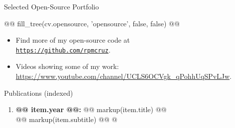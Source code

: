 \documentclass[11pt]{article}
\begin{document}
\bigskip
\centerline{\sc\large Selected Open-Source Portfolio}
\begin{multicols}{2}
\setlength{\columnseprule}{0.4pt}
@@ fill_tree(cv.opensource, 'opensource', false, false) @@
\begin{itemize}
\small
\renewcommand{\labelitemi}{$\blacktriangleright$}
\setlength{\itemindent}{-1.5em}
\itemsep0em 
\item Find more of my open-source code at\\\href{https://github.com/rpmcruz?tab=repositories}{\tt https://github.com/rpmcruz}.
\item Videos showing some of my work: \url{https://www.youtube.com/channel/UCLS6OCVgk_qPohhUqSPvLJw}.
\end{itemize}
\end{multicols}


\newpage
\centerline{\sc\large Publications (indexed)}

\begin{enumerate}
\itemsep0em
@%
\item \textbf{@@ item.year @@:} @@ markup(item.title) @@\\
@@ markup(item.subtitle) @@
@%
\end{enumerate}
\end{document}

